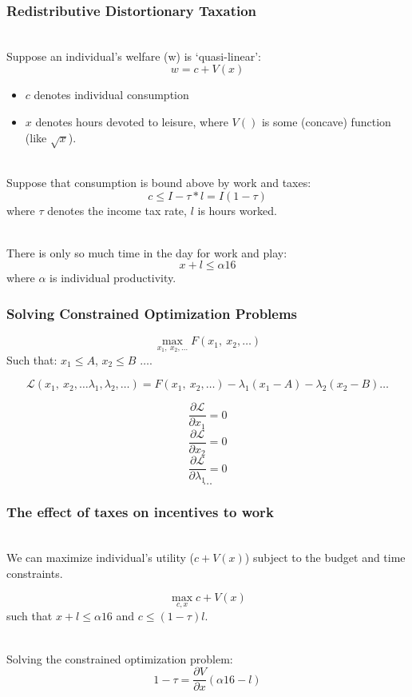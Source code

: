 \documentclass{beamer}
\numberwithin{equation}{section}
\begin{document}
\begin{frame}
\frametitle{Redistributive Distortionary Taxation}


\ \\Suppose an individual's welfare (w) is `quasi-linear':
$$w = c + V(x)$$
\begin{itemize}
\item $c$ denotes individual consumption 
\item $x$ denotes hours devoted to leisure, where $V()$ is some (concave) function (like $\sqrt{x}$). \pause
\end{itemize}
\ \\Suppose that consumption is bound above by work and taxes:
$$c \leq I  - \tau*l = I(1-\tau)$$
where $\tau$ denotes the income tax rate, $l$ is hours worked.\pause

\ \\There is only so much time in the day for work and play:
$$x + l \leq \alpha 16$$
where $\alpha$ is individual productivity. 

\end{frame}


\begin{frame}
\frametitle{Solving Constrained Optimization Problems}

$$\max_{x_1,\ x_2, \ldots} F(x_1,\ x_2, \ldots)$$
Such that: $x_1\leq A$, \quad $x_2 \leq B$ $\ldots$.




$$\mathcal{L}(x_1,\ x_2, \ldots \lambda_1, \lambda_2, \ldots)=  F(x_1,\ x_2, \ldots) - \lambda_1(x_1-A)-\lambda_2(x_2-B)\ldots$$

$$\frac{\partial\mathcal{L}}{\partial x_1}=0$$
$$\frac{\partial\mathcal{L}}{\partial x_2}=0$$
$$\frac{\partial\mathcal{L}}{\partial \lambda_1}=0$$
$$\ldots$$
\end{frame}



\begin{frame}
\frametitle{The effect of taxes on incentives to work}


\ \\We can maximize individual's utility ($c + V(x)$) subject to the budget and time constraints. \pause

$$\max_{c, x} c + V(x)$$
such that $x + l \leq \alpha 16$ and $c \leq (1 - \tau)l $.\pause

\ \\Solving the constrained optimization problem:
$$1 - \tau = \frac{\partial V } {\partial x}(\alpha 16 - l)$$\pause

\end{frame}
\end{document}
